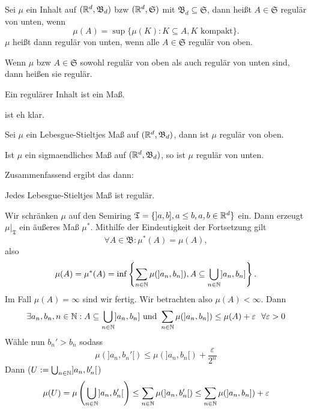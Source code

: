 			\begin{defi}
				Sei $\mu$ ein Inhalt auf $(\mathbb{R}^d, \mathfrak{B}_d)$ bzw $(\mathbb{R}^d, \mathfrak{S})$ mit $\mathfrak{B}_d\subseteq\mathfrak{S}$, dann heißt $A\in\mathfrak{S}$ regulär von unten, wenn
				\[ \mu(A)=\sup\{\mu(K):K\subseteq A, K\text{ kompakt}\}. \]
				$\mu$ heißt dann regulär von unten, wenn alle $A\in\mathfrak{S}$ regulär von oben. 
			\end{defi}
			
			\begin{defi}
				Wenn $\mu$ bzw $A\in\mathfrak{S}$ sowohl regulär von oben als auch regulär von unten sind, dann heißen sie regulär. 
			\end{defi}
			
			\begin{satz}
				Ein regulärer Inhalt ist ein Maß. 
			\end{satz}
			
			\begin{bew}
				ist eh klar. 
			\end{bew}
			
			\begin{satz}
				Sei $\mu$ ein Lebesgue-Stieltjes Maß auf $(\mathbb{R}^d, \mathfrak{B}_d)$, dann ist $\mu$ regulär von oben.
			\end{satz}
			
			\begin{satz}
				Ist $\mu$ ein sigmaendliches Maß auf $(\mathbb{R}^d, \mathfrak{B}_d)$, so ist $\mu$ regulär von unten. 
			\end{satz}
			
			Zusammenfassend ergibt das dann:
			\begin{satz}
				Jedes Lebesgue-Stieltjes Maß ist regulär. 
			\end{satz}
			
			\begin{bew}[1. Satz]
				Wir schränken $\mu$ auf den Semiring $\mathfrak{T}=\{]a,b], a\le b, a,b\in\mathbb{R}^d\}$ ein. Dann erzeugt $\mu|_\mathfrak{T}$ ein äußeres Maß $\mu^*$. Mithilfe der Eindeutigkeit der Fortsetzung gilt 
				\[ \forall A\in\mathfrak{B}: \mu^*(A)=\mu(A), \]
				also 
				\[ \mu(A)=\mu^*(A)=\inf\left\{\sum_{n\in\mathbb{N}}\mu(]a_n,b_n]), A\subseteq\bigcup_{n\in\mathbb{N}} ]a_n,b_n]\right\}. \]
				Im Fall $\mu(A)=\infty$ sind wir fertig. Wir betrachten also $\mu(A)<\infty$. Dann
				\[ \exists a_n,b_n,n\in\mathbb{N}: A\subseteq \bigcup_{n\in\mathbb{N}}]a_n,b_n]\text{ und } \sum_{n\in\mathbb{N}}\mu(]a_n,b_n])\le\mu(A)+\varepsilon \:\:\:\forall \varepsilon>0 \]
				Wähle nun $b_n'>b_n$ sodass 
				\[\mu(]a_n,b_n'[)\le\mu(]a_n,b_n[)+\frac{\varepsilon}{2^n}\]
				Dann ($U:=\bigcup_{n\in\mathbb{N}} ]a_n,b_n'[$)
				\[ \mu(U)=\mu\left(\bigcup_{n\in\mathbb{N}} ]a_n,b_n'[\right)\le\sum_{n\in\mathbb{N}}\mu(]a_n,b_n'[)\le\sum_{n\in\mathbb{N}}\mu(]a_n,b_n])+\varepsilon \]
			\end{bew}
			
